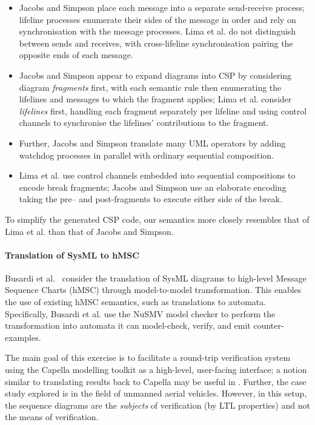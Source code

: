 \begin{itemize}
\item
  Jacobs and Simpson place each message into a
  separate send-receive process; lifeline processes enumerate their
  sides of the message in order and rely on
  synchronisation with the message processes.
  Lima et al. do not
  distinguish between sends and receives, with
  cross-lifeline synchronisation pairing the opposite
  ends of each message.
\item
  Jacobs and Simpson appear to expand diagrams into CSP by
  considering diagram \emph{fragments} first, with each semantic rule
  then enumerating the lifelines and messages to which the fragment applies;
  Lima et al. consider \emph{lifelines} first, handling each fragment
  separately per lifeline and using control channels to synchronise the
  lifelines' contributions to the fragment.
\item
  Further, Jacobs and Simpson translate many UML operators by adding watchdog
  processes in parallel with ordinary sequential composition.
\item
  Lima et al. use control channels embedded into sequential compositions to
  encode break fragments;
  Jacobs and Simpson use an elaborate encoding taking the pre-- and
  post-fragments to execute either side of the break.
\end{itemize}

To simplify the generated CSP code, our semantics more closely resembles that of
Lima et al. than that of Jacobs and Simpson.

\paragraph{Translation of SysML to hMSC}

Busardi et al.~\cite{Busard21-SDviaHMSC} consider the translation of SysML diagrams to high-level Message Sequence
Charts (hMSC) through model-to-model transformation.  This enables
the use of existing hMSC semantics, such as translations to
automata.  Specifically, Busardi et al. use the NuSMV model
checker to perform the transformation into automata it can
model-check, verify, and emit counter-examples.

The main goal of this exercise is to facilitate a round-trip
verification system using the Capella modelling toolkit as a
high-level, user-facing interface; a notion similar to translating results
back to Capella may be useful in \langname.  Further, the case study explored is
in the field of unmanned aerial vehicles.
However, in this setup, the
sequence diagrams are the \emph{subjects} of verification (by LTL properties)
and not the means of verification.

